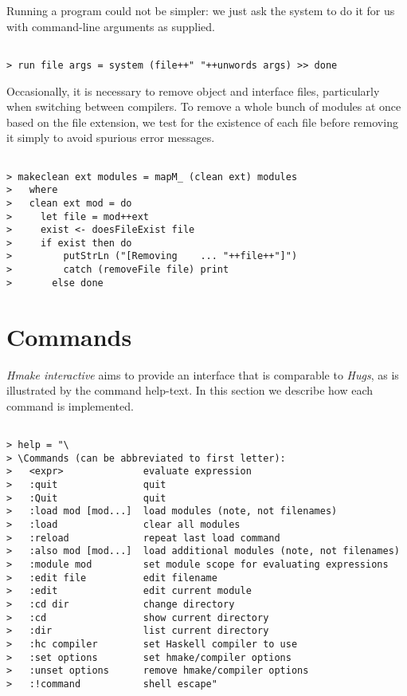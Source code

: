 \documentclass[a4paper]{article}
\begin{document}
Running a program could not be simpler: we just ask the system to
do it for us with command-line arguments as supplied.

\begin{verbatim}

> run file args = system (file++" "++unwords args) >> done

\end{verbatim}

Occasionally, it is necessary to remove object and interface files,
particularly when switching between compilers.  To remove a whole
bunch of modules at once based on the file extension, we test
for the existence of each file before removing it simply to avoid
spurious error messages.

\begin{verbatim}

> makeclean ext modules = mapM_ (clean ext) modules
>   where
>   clean ext mod = do
>     let file = mod++ext
>     exist <- doesFileExist file
>     if exist then do
>         putStrLn ("[Removing    ... "++file++"]")
>         catch (removeFile file) print
>       else done

\end{verbatim}



\section{Commands}

{\em Hmake interactive} aims to provide an interface that is comparable
to {\em Hugs}, as is illustrated by the command help-text.  In this
section we describe how each command is implemented.

\begin{verbatim}

> help = "\ 
> \Commands (can be abbreviated to first letter):
>   <expr>              evaluate expression
>   :quit               quit
>   :Quit               quit
>   :load mod [mod...]  load modules (note, not filenames)
>   :load               clear all modules
>   :reload             repeat last load command
>   :also mod [mod...]  load additional modules (note, not filenames)
>   :module mod         set module scope for evaluating expressions
>   :edit file          edit filename
>   :edit               edit current module
>   :cd dir             change directory
>   :cd                 show current directory
>   :dir                list current directory
>   :hc compiler        set Haskell compiler to use
>   :set options        set hmake/compiler options
>   :unset options      remove hmake/compiler options
>   :!command           shell escape"

\end{verbatim}
\end{document}
